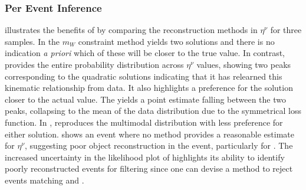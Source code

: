 \subsubsection{Per Event Inference}

 illustrates the benefits of \vflows by comparing the reconstruction methods in $\eta^\nu$ for three samples.
In  the $m_W$ constraint method yields two solutions and there is no indication \textit{a priori} which of these will be closer to the true value.
In contrast, \vflows provides the entire probability distribution across $\eta^\nu$ values, showing two peaks corresponding to the quadratic solutions indicating that it has relearned this kinematic relationship from data.
It also highlights a preference for the solution closer to the actual value.
The \vff yields a point estimate falling between the two peaks, collapsing to the mean of the data distribution due to the symmetrical loss function.
In , \vflows reproduces the multimodal distribution with less preference for either solution.
 shows an event where no method provides a reasonable estimate for $\eta^\nu$, suggesting poor object reconstruction in the event, particularly for \ptmiss.
The increased uncertainty in the likelihood plot of \vflows highlights its ability to identify poorly reconstructed events for filtering since one can devise a method to reject events matching  and .

